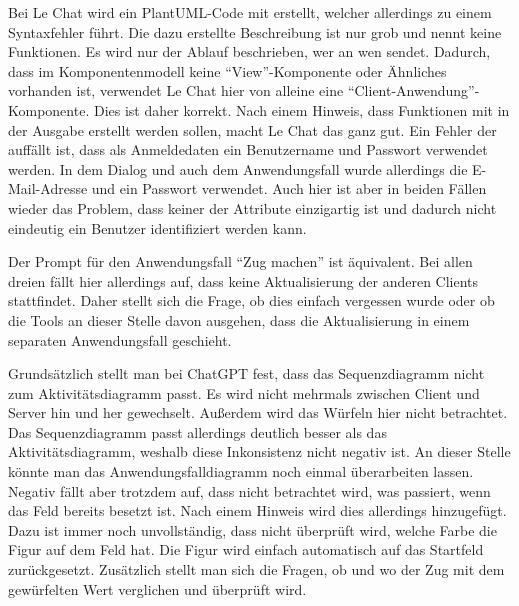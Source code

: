 Bei Le Chat wird ein PlantUML-Code mit erstellt, welcher allerdings zu einem Syntaxfehler führt. Die dazu erstellte Beschreibung ist 
nur grob und nennt keine Funktionen. Es wird nur der Ablauf beschrieben, wer an wen sendet. Dadurch, dass im Komponentenmodell keine 
``View''-Komponente oder Ähnliches vorhanden ist, verwendet Le Chat hier von alleine eine ``Client-Anwendung''-Komponente. Dies ist daher 
korrekt. Nach einem Hinweis, dass Funktionen mit in der Ausgabe erstellt werden sollen, macht Le Chat das ganz gut. Ein Fehler der 
auffällt ist, dass als Anmeldedaten ein Benutzername und Passwort verwendet werden. In dem Dialog und auch dem Anwendungsfall wurde 
allerdings die E-Mail-Adresse und ein Passwort verwendet. Auch hier ist aber in beiden Fällen wieder das Problem, dass keiner der 
Attribute einzigartig ist und dadurch nicht eindeutig ein Benutzer identifiziert werden kann.

Der Prompt für den Anwendungsfall ``Zug machen'' ist äquivalent. Bei allen dreien fällt hier allerdings auf, dass keine Aktualisierung 
der anderen Clients stattfindet. Daher stellt sich die Frage, ob dies einfach vergessen wurde oder ob die Tools an dieser Stelle davon 
ausgehen, dass die Aktualisierung in einem separaten Anwendungsfall geschieht.

Grundsätzlich stellt man bei ChatGPT fest, dass das Sequenzdiagramm nicht zum Aktivitätsdiagramm passt. Es wird nicht mehrmals 
zwischen Client und Server hin und her gewechselt. Außerdem wird das Würfeln hier nicht betrachtet. Das Sequenzdiagramm passt 
allerdings deutlich besser als das Aktivitätsdiagramm, weshalb diese Inkonsistenz nicht negativ ist. An dieser Stelle könnte man das 
Anwendungsfalldiagramm noch einmal überarbeiten lassen. Negativ fällt aber trotzdem auf, dass nicht betrachtet wird, was passiert, 
wenn das Feld bereits besetzt ist. Nach einem Hinweis wird dies allerdings hinzugefügt. Dazu ist immer noch unvollständig, dass nicht 
überprüft wird, welche Farbe die Figur auf dem Feld hat. Die Figur wird einfach automatisch auf das Startfeld zurückgesetzt. 
Zusätzlich stellt man sich die Fragen, ob und wo der Zug mit dem gewürfelten Wert verglichen und überprüft wird. 

